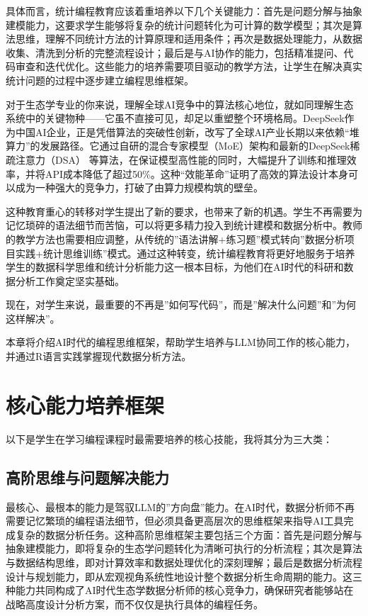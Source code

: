 \documentclass[
  twoside]{book}
\begin{document}
具体而言，统计编程教育应该着重培养以下几个关键能力：首先是问题分解与抽象建模能力，这要求学生能够将复杂的统计问题转化为可计算的数学模型；其次是算法思维，理解不同统计方法的计算原理和适用条件；再次是数据处理能力，从数据收集、清洗到分析的完整流程设计；最后是与AI协作的能力，包括精准提问、代码审查和迭代优化。这些能力的培养需要项目驱动的教学方法，让学生在解决真实统计问题的过程中逐步建立编程思维框架。

对于生态学专业的你来说，理解全球AI竞争中的算法核心地位，就如同理解生态系统中的关键物种------它虽不直接可见，却足以重塑整个环境格局。DeepSeek作为中国AI企业，正是凭借算法的突破性创新，改写了全球AI产业长期以来依赖``堆算力''的发展路径。它通过自研的混合专家模型（MoE）架构和最新的DeepSeek稀疏注意力（DSA） 等算法，在保证模型高性能的同时，大幅提升了训练和推理效率，并将API成本降低了超过50\%。这种``效能革命''证明了高效的算法设计本身可以成为一种强大的竞争力，打破了由算力规模构筑的壁垒。

这种教育重心的转移对学生提出了新的要求，也带来了新的机遇。学生不再需要为记忆琐碎的语法细节而苦恼，可以将更多精力投入到统计建模和数据分析中。教师的教学方法也需要相应调整，从传统的''语法讲解+练习题''模式转向''数据分析项目实践+统计思维训练''模式。通过这种转变，统计编程教育将更好地服务于培养学生的数据科学思维和统计分析能力这一根本目标，为他们在AI时代的科研和数据分析工作奠定坚实基础。

现在，对学生来说，最重要的不再是''如何写代码''，而是''解决什么问题''和''为何这样解决''。

本章将介绍AI时代的编程思维框架，帮助学生培养与LLM协同工作的核心能力，并通过R语言实践掌握现代数据分析方法。

\hypertarget{ux6838ux5fc3ux80fdux529bux57f9ux517bux6846ux67b6}{%
\section{核心能力培养框架}\label{ux6838ux5fc3ux80fdux529bux57f9ux517bux6846ux67b6}}

以下是学生在学习编程课程时最需要培养的核心技能，我将其分为三大类：

\hypertarget{ux9ad8ux9636ux601dux7ef4ux4e0eux95eeux9898ux89e3ux51b3ux80fdux529b}{%
\subsection{高阶思维与问题解决能力}\label{ux9ad8ux9636ux601dux7ef4ux4e0eux95eeux9898ux89e3ux51b3ux80fdux529b}}

最核心、最根本的能力是驾驭LLM的''方向盘''能力。在AI时代，数据分析师不再需要记忆繁琐的编程语法细节，但必须具备更高层次的思维框架来指导AI工具完成复杂的数据分析任务。这种高阶思维框架主要包括三个方面：首先是问题分解与抽象建模能力，即将复杂的生态学问题转化为清晰可执行的分析流程；其次是算法与数据结构思维，即对计算效率和数据处理优化的深刻理解；最后是数据分析流程设计与规划能力，即从宏观视角系统性地设计整个数据分析生命周期的能力。这三种能力共同构成了AI时代生态学数据分析师的核心竞争力，确保研究者能够站在战略高度设计分析方案，而不仅仅是执行具体的编程任务。
\end{document}
